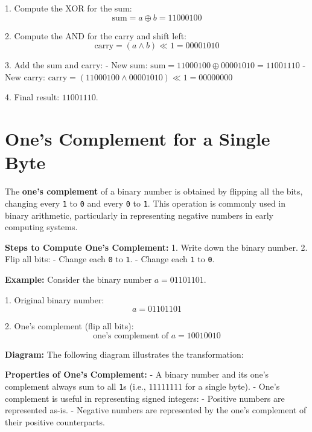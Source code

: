 \documentclass{report}
\begin{document}
1. Compute the XOR for the sum:
\[
	\text{sum} = a \oplus b = 11000100
\]

2. Compute the AND for the carry and shift left:
\[
	\text{carry} = (a \land b) \ll 1 = 00001010
\]

3. Add the sum and carry:
- New sum: \( \text{sum} = 11000100 \oplus 00001010 = 11001110 \)
- New carry: \( \text{carry} = (11000100 \land 00001010) \ll 1 = 00000000 \)

4. Final result: \( 11001110 \).

\section{One's Complement for a Single Byte}

The \textbf{one's complement} of a binary number is obtained by flipping all the bits, changing every \texttt{1} to \texttt{0} and every \texttt{0} to \texttt{1}. This operation is commonly used in binary arithmetic, particularly in representing negative numbers in early computing systems.

\textbf{Steps to Compute One's Complement:}
1. Write down the binary number.
2. Flip all bits:
- Change each \texttt{0} to \texttt{1}.
- Change each \texttt{1} to \texttt{0}.

\textbf{Example:}
Consider the binary number \(a = 01101101\).

1. Original binary number:
\[
	a = 01101101
\]

2. One's complement (flip all bits):
\[
	\text{one's complement of } a = 10010010
\]

\textbf{Diagram:}
The following diagram illustrates the transformation:

\begin{center}
\end{center}

\textbf{Properties of One's Complement:}
- A binary number and its one's complement always sum to all \texttt{1}s (i.e., \(11111111\) for a single byte).
- One's complement is useful in representing signed integers:
- Positive numbers are represented as-is.
- Negative numbers are represented by the one's complement of their positive counterparts.
\end{document}
